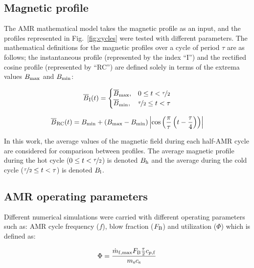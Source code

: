 \documentclass[draft]{svjour3}
\newcommand{\bmax}{\ensuremath{{B}\ped{max}}}
\newcommand{\bmin}{\ensuremath{{B}\ped{min}}}
\begin{document}
\subsection{Magnetic profile}
\label{sec:magnetic-profile}

The AMR mathematical model takes the magnetic profile as an input, and the profiles represented in Fig.~\ref{fig:cycles} were tested with different parameters. The mathematical definitions for the magnetic profiles over a cycle of period $\tau$ are as follows; the instantaneous profile (represented by the index ``I'') and the rectified cosine profile (represented by ``RC'') are defined solely in terms of the extrema values $\bmax$ and $\bmin$:

\begin{equation}
\overline{B}_{\mathrm{I}}(t)=
\begin{cases}
\overline{B}_{\mathrm{max}}, & 0 \le t < \nicefrac{\tau}{2} \\
\overline{B}_{\mathrm{min}}, & \nicefrac{\tau}{2} \le t < \tau\\
\end{cases}
\label{eq:4}
\end{equation}

\begin{equation}
\average{B}\ped{RC}(t) = \bmin + \left(\bmax - \bmin\right)  \left\lvert \cos\left( \frac{\pi}{\tau} \left( t - \frac{\tau}{4}\right)\right) \right\rvert
\label{eq:5}
\end{equation}


In this work, the average values of the magnetic field during each half-AMR cycle are considered for comparison between profiles. The average magnetic profile during the hot cycle ($0 \le t < \nicefrac{\tau}{2}$) is denoted $B_{\mathrm{h}}$ and the average during the cold cycle  ($ \nicefrac{\tau}{2} \le t < \tau$) is denoted $B_{\mathrm{l}}$.

\subsection{AMR operating parameters}
\label{sec:amr-oper-param}


Different numerical simulations were carried with different operating parameters such as: AMR cycle frequency ($f$), blow fraction ($F_{\mathrm{B}}$) and utilization ($\Phi$) which is defined as:

\begin{equation}
\Phi = \frac{\dot{m}_{\mathrm{f,max}}F_{\mathrm{B}}\frac{\tau}{2}c_{p,\mathrm{f}}}{m_{\mathrm{s}} c_{\mathrm{s}}}
\label{eq:2}
\end{equation}
\end{document}

